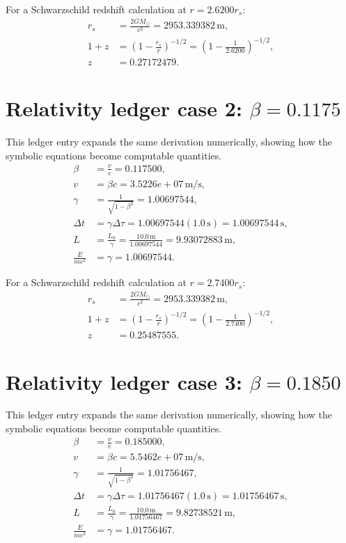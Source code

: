 \documentclass[11pt,a4paper]{article}
\begin{document}
For a Schwarzschild redshift calculation at $r=2.6200r_s$:
\begin{align}
r_s &= \frac{2GM_\odot}{c^2}=2953.339382\,\mathrm{m},\\
1+z &= \left(1-\frac{r_s}{r}\right)^{-1/2}
=\left(1-\frac{1}{2.6200}\right)^{-1/2},\\
z&=0.27172479.
\end{align}

\section{Relativity ledger case 2: $\beta=0.1175$}
This ledger entry expands the same derivation numerically, showing how the symbolic equations become computable quantities.
\begin{align}
\beta &= \frac{v}{c}=0.117500,\\
v &= \beta c = 3.5226e+07\,\mathrm{m/s},\\
\gamma &= \frac{1}{\sqrt{1-\beta^2}} = 1.00697544,\\
\Delta t &= \gamma\Delta\tau = 1.00697544(1.0\,\mathrm{s}) = 1.00697544\,\mathrm{s},\\
L &= \frac{L_0}{\gamma} = \frac{10.0\,\mathrm{m}}{1.00697544} = 9.93072883\,\mathrm{m},\\
\frac{E}{mc^2}&=\gamma=1.00697544.
\end{align}

For a Schwarzschild redshift calculation at $r=2.7400r_s$:
\begin{align}
r_s &= \frac{2GM_\odot}{c^2}=2953.339382\,\mathrm{m},\\
1+z &= \left(1-\frac{r_s}{r}\right)^{-1/2}
=\left(1-\frac{1}{2.7400}\right)^{-1/2},\\
z&=0.25487555.
\end{align}

\newpage

\section{Relativity ledger case 3: $\beta=0.1850$}
This ledger entry expands the same derivation numerically, showing how the symbolic equations become computable quantities.
\begin{align}
\beta &= \frac{v}{c}=0.185000,\\
v &= \beta c = 5.5462e+07\,\mathrm{m/s},\\
\gamma &= \frac{1}{\sqrt{1-\beta^2}} = 1.01756467,\\
\Delta t &= \gamma\Delta\tau = 1.01756467(1.0\,\mathrm{s}) = 1.01756467\,\mathrm{s},\\
L &= \frac{L_0}{\gamma} = \frac{10.0\,\mathrm{m}}{1.01756467} = 9.82738521\,\mathrm{m},\\
\frac{E}{mc^2}&=\gamma=1.01756467.
\end{align}
\end{document}
